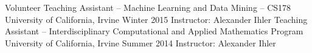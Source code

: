\begin{cventries}
    \cventrynarrow
        {Volunteer Teaching Assistant -- Machine Learning and Data Mining -- CS178}
        {University of California, Irvine}
        {}
        {Winter 2015}
        {Instructor: Alexander Ihler}
    \cventrynarrow
        {Teaching Assistant -- Interdisciplinary Computational and
          Applied Mathematics Program}
        {University of California, Irvine}
        {}
        {Summer 2014}
        {Instructor: Alexander Ihler}
\end{cventries}
